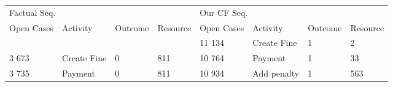 \begin{tabular}{llllllll}
\toprule
\multicolumn{4}{l}{Factual Seq.} & \multicolumn{4}{l}{Our CF Seq.} \\
Open Cases & Activity & Outcome & Resource & Open Cases & Activity & Outcome & Resource \\
\midrule
 &  &  &  & 11 134 & Create Fine & 1 & 2 \\
3 673 & Create Fine & 0 & 811 & 10 764 & Payment & 1 & 33 \\
3 735 & Payment & 0 & 811 & 10 934 & Add penalty & 1 & 563 \\
\bottomrule
\end{tabular}
